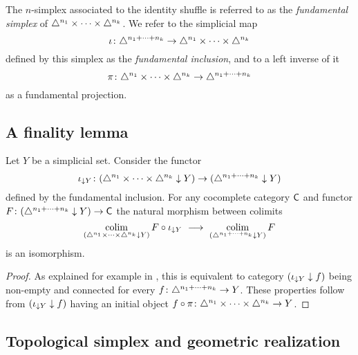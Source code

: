 The $n$-simplex associated to the identity shuffle is referred to as the \textit{fundamental simplex} of $\triangle^{n_1} \times \dots \times \triangle^{n_k}$.
We refer to the simplicial map
\[
\operatorname{\iota} \colon
\triangle^{n_1+\dots+n_k} \to
\triangle^{n_1} \times \dots \times \triangle^{n_k}
\]
defined by this simplex as the \textit{fundamental inclusion}, and to a left inverse of it
\[
\operatorname{\pi} \colon
\triangle^{n_1} \times \dots \times \triangle^{n_k} \to
\triangle^{n_1+\dots+n_k}
\]
as a fundamental projection. 

\subsection{A finality lemma} \label{ss:finality}

Let $Y$ be a simplicial set.
Consider the functor
\[
\operatorname{\iota}_{\downarrow Y} \colon (\triangle^{n_1} \times \dots \times \triangle^{n_k} \downarrow Y) \to (\triangle^{n_1+\dots+n_k} \downarrow Y)
\]
defined by the fundamental inclusion.
For any cocomplete category $\mathsf{C}$ and functor $F \colon (\triangle^{n_1+\dots+n_k} \downarrow Y) \to \mathsf{C}$ the natural morphism between colimits
\[
\operatorname*{colim}_{(\triangle^{n_1} \times \dots \times \triangle^{n_k} \downarrow Y)} F \circ \operatorname{\iota}_{\downarrow Y} \
\longrightarrow \
\operatorname*{colim}_{(\triangle^{n_1+\dots+n_k} \downarrow Y)} F
\]
is an isomorphism.

\begin{proof}
	As explained for example in \cite[]{riehl2014categorical}, this is equivalent to category $(\operatorname{\iota}_{\downarrow Y} \downarrow f)$ being non-empty and connected for every $f \colon \triangle^{n_1+\dots+n_k} \to Y$.
	These properties follow from $(\operatorname{\iota}_{\downarrow Y} \downarrow f)$ having an initial object $f \circ \operatorname{\pi} \colon \triangle^{n_1} \times \dots \times \triangle^{n_k} \to Y$.
\end{proof}

\subsection{Topological simplex and geometric realization}

